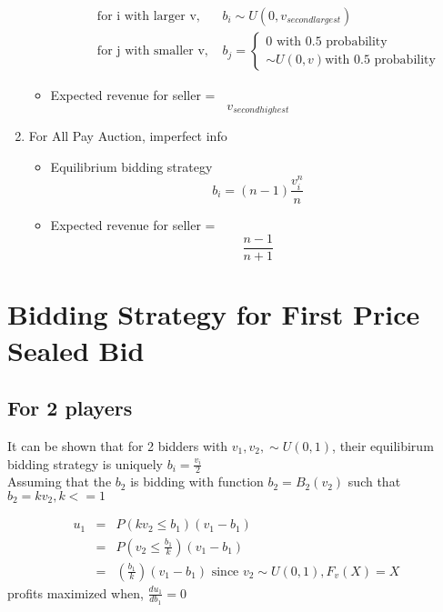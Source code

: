 \documentclass[10pt, a4paper]{article}
\begin{document}
\begin{enumerate}
\begin{itemize}
\begin{itemize}
                   \begin{align*}
                      \text{for i with larger v, } & b_i \sim U(0, v_{second largest}) \\
                      \text{for j with smaller v, }& b_j = 
                      \begin{cases}
                         0  \text{ with 0.5 probability} \\
                         \sim U(0, v) \text{with 0.5 probability}
                      \end{cases}
                   \end{align*}
             \end{itemize}
          \item Expected revenue for seller = \[v_{second highest}\]
      \end{itemize}
   \item For All Pay Auction, imperfect info
      \begin{itemize}
         \item Equilibrium bidding strategy 
            \[
               b_i = (n-1)\frac{v_i^{n}}{n}
            \]
         \item Expected revenue for seller = \[\frac{n-1}{n+1}\]
      \end{itemize}
\end{enumerate}


\section{Bidding Strategy for First Price Sealed Bid}
\subsection{For 2 players}

It can be shown that for 2 bidders with $v_1, v_2, \sim U(0, 1)$, their equilibirum bidding strategy is uniquely $b_i = \frac{v_i}{2}$ \\

Assuming that the $b_2$ is bidding with function $b_2 = B_2(v_2)$ such that $b_2 = kv_2, k <= 1$

\begin{eqnarray}
u_1 & = & P(kv_2 \le b_1)(v_1-b_1) \nonumber \\
& = & P(v_2 \le \frac{b_1}{k})(v_1-b_1) \nonumber \\
& = & (\frac{b_1}{k})(v_1-b_1) \nonumber \text{ since $v_2 \sim U(0, 1), F_v(X) = X$}  
\end{eqnarray}
profits maximized when, $\frac{du_1}{db_1} = 0$ 
\end{document}
